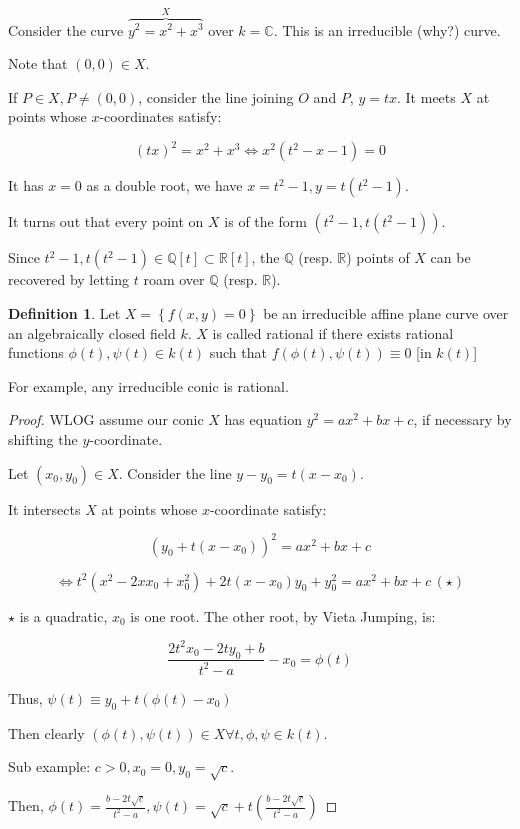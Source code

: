 \documentclass{article}
\theoremstyle{definition}
\newtheorem*{definition}{Definition}
\begin{document}
    Consider the curve \(\overbrace{y^2 = x^2 + x^3}^{X}\) over \(k=\mathbb{C}\). This is an irreducible (why?) curve.

    Note that \((0,0)\in X\).

    If \(P\in X, P \neq (0,0)\), consider the line joining \(O\) and \(P\), \(y = tx\). It meets \(X\) at points whose \(x\)-coordinates satisfy:

    \[
        (tx)^{2} = x^{2} +x^3 \iff x^{2} (t^2 - x - 1) = 0
    \]

    It has \(x=0\) as a double root, we have \(x=t^2 - 1, y = t(t^2 - 1)\).
    
    It turns out that every point on \(X\) is of the form \((t^2 - 1, t(t^2 - 1))\).

    Since \(t^2 - 1, t(t^2 - 1) \in \mathbb{Q}[t] \subset \mathbb{R} [t]\), the \(\mathbb{Q}\) (resp. \(\mathbb{R}\)) points of \(X\) can be recovered by letting \(t\) roam over \(\mathbb{Q}\) (resp. \(\mathbb{R}\)).

    \begin{definition}
        Let \(X = \left\{ f(x,y) = 0 \right\}\) be an irreducible affine plane curve over an algebraically closed field \(k\). \(X\) is called rational if there exists rational functions \(\phi(t), \psi(t) \in k(t)\) such that \(f(\phi(t),\psi(t)) \equiv 0\) [in \(k(t)\)]
    \end{definition}

    For example, any irreducible conic is rational.

    \begin{proof}
        WLOG assume our conic \(X\) has equation \(y^2 = ax^2 + bx + c\), if necessary by shifting the \(y\)-coordinate.
        
        Let \((x_0, y_0)\in X\). Consider the line \(y - y_0 = t(x - x_0)\).
        
        It intersects \(X\) at points whose \(x\)-coordinate satisfy:

        \[
            (y_0 + t(x-x_0))^2 = ax^2 + bx + c
        \]

        \[
            \iff t^2(x^2 - 2xx_0 + x_0^2) + 2t(x-x_0)y_0 + y_0^2 = ax^2 + bx + c \, (\star)
        \]

        \(\star\) is a quadratic, \(x_0\) is one root. The other root, by Vieta Jumping, is:
        
        \[
            \frac{2t^2 x_0 - 2ty_0 + b}{t^2 - a} - x_0 = \phi(t)
        \]

        Thus, \(\psi(t) \equiv  y_0 + t(\phi(t) - x_0)\)

        Then clearly \((\phi(t), \psi(t))\in X \forall t, \phi, \psi \in k(t)\).

        Sub example: \(c > 0, x_0 = 0, y_0 = \sqrt{c} \).
        
        Then, \(\phi(t) = \frac{b - 2t \sqrt{c}}{t^2 - a}, \psi(t) = \sqrt{c} + t\left(\frac{b - 2t \sqrt{c}}{t^2 - a}\right) \) 
    \end{proof}
\end{document}
